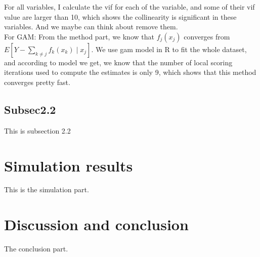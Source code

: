 \documentclass[12pt]{article}
\begin{document}
    For all variables, I calculate the vif for each of the variable, and some of their vif value are larger than 10, which shows the collinearity is significant in these variables. And we maybe can think about remove them. \\ 
For GAM: 
    From the method part, we know that $f_j(x_j)$ converges from $E \left[Y-\sum_{k \neq j}f_k(x_k)\mid{x_j} \right]$. We use gam model in R to fit the whole dataset, and according to model we get, we know that the number of local scoring iterations used to compute the estimates is only 9, which shows that this method converges pretty fast.

\subsection{Subsec2.2}
This is subsection 2.2
\section[Simulation Study]{Simulation results}\label{sec:sim}
This is the simulation part.
\section{Discussion and conclusion}
\label{sec:conc}
The conclusion part.
\setlength{\bibsep}{0pt plus 0.3ex}

{\footnotesize
}
\end{document}

